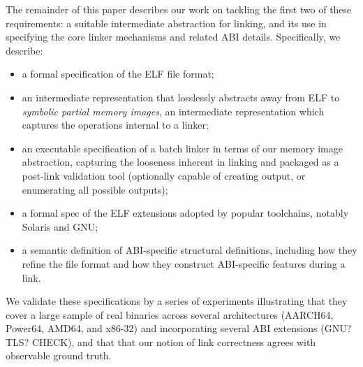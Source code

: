The remainder of this paper describes our work on tackling the first
two of these requirements:
a suitable intermediate abstraction for linking,
and its use in specifying the core linker mechanisms
and related ABI details. Specifically, we describe:

\begin{itemize}

\item a formal specification of the ELF file format;

\item an intermediate representation
       that losslessly abstracts away from ELF 
       to \emph{symbolic partial memory images}, 
       an intermediate representation 
       which captures the operations internal to a linker;

\item an executable specification of a batch linker in terms of our memory image abstraction, 
        capturing the looseness inherent in linking
        and packaged as a post-link validation tool
        (optionally capable of creating output, 
         or enumerating all possible outputs);

\item a formal spec of the ELF extensions adopted by popular toolchains, 
        notably Solaris and GNU;

\item  a semantic definition of ABI-specific structural definitions,
       including how they refine the file format
       and how they construct ABI-specific features during a link.

\end{itemize}

We validate these specifications 
by a series of experiments 
illustrating that 
they cover 
a large sample of real binaries across several architectures (AARCH64, Power64, AMD64, and x86-32)
and incorporating several ABI extensions (GNU? TLS? CHECK),
and that that our notion of link correctness agrees with observable ground truth.
